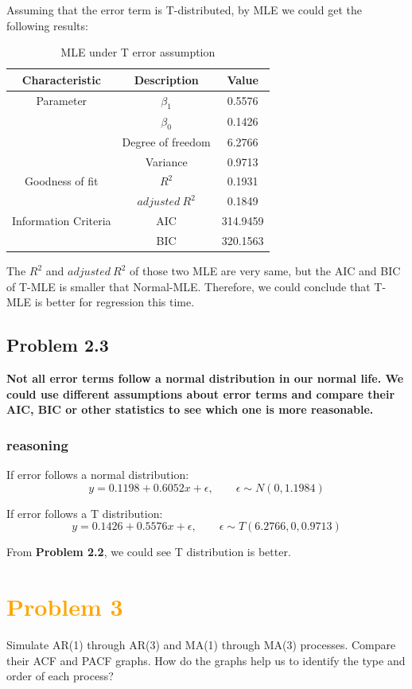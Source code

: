 \documentclass[11pt,en]{elegantpaper}
\begin{document}
Assuming that the error term is T-distributed, by MLE we could get the following results:

\begin{table}[h]
    \centering
    \caption{MLE under T error assumption}
    \label{table6}
    \begin{tabular}{@{}ccc@{}}
        \toprule
        \textbf{Characteristic} & \textbf{Description} & \textbf{Value}\\
        \midrule
        Parameter & $\beta_1$ & 0.5576 \\
        & $\beta_0$ & 0.1426 \\
        & Degree of freedom  & 6.2766 \\
        & Variance & 0.9713 \\
        Goodness of fit & $R^2$ & 0.1931 \\
        & $adjusted\  R^2$ & 0.1849 \\
        Information Criteria & AIC & 314.9459 \\
        & BIC & 320.1563 \\
        \bottomrule
    \end{tabular}
\end{table}

The $R^2$ and $adjusted\  R^2$ of those two MLE are very same, but the AIC and BIC of T-MLE is smaller that
Normal-MLE. Therefore, we could conclude that T-MLE is better for regression this time.

\subsection*{Problem 2.3}
\textbf{Not all error terms follow a normal distribution in our normal life. We could use different 
assumptions about error terms and compare their AIC, BIC or other statistics to see which one 
is more reasonable.}

\subsubsection*{reasoning}
If error follows a normal distribution:
\[y=0.1198+0.6052x+\epsilon, \qquad \epsilon \sim N(0,1.1984)\]

If error follows a T distribution:
\[y=0.1426+0.5576x+\epsilon, \qquad \epsilon \sim T(6.2766,0,0.9713)\]

From \textbf{Problem 2.2}, we could see T distribution is better.

\section*{\textcolor{orange}{Problem 3}}
Simulate AR(1) through AR(3) and MA(1) through MA(3) processes. Compare their ACF and PACF 
graphs. How do the graphs help us to identify the type and order of each process?
\end{document}
